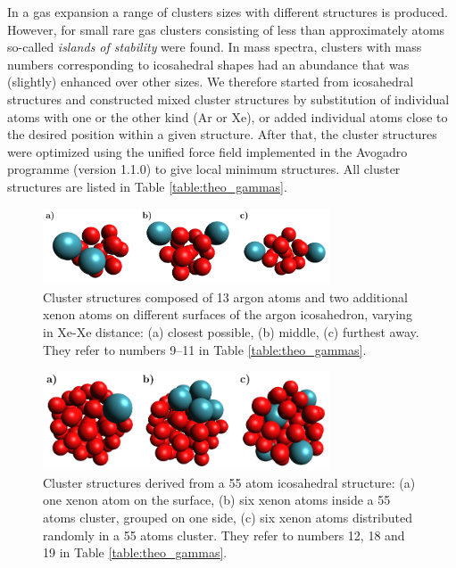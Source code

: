 In a gas expansion a range of clusters sizes with different structures is produced. 
However, for small rare gas clusters consisting of less than approximately \unit[1000]{atoms} so-called \emph{islands of stability} were found.\cite{haberland}  
In mass spectra, clusters with mass numbers corresponding to icosahedral shapes had an abundance that was (slightly) enhanced over other sizes. 
We therefore started from icosahedral structures and constructed mixed cluster structures by substitution of individual atoms with one or the other kind (Ar or Xe), or added individual atoms close to the desired position within a given structure. 
After that, the cluster structures were optimized using the unified force
field implemented in the 
Avogadro programme (version 1.1.0) \cite{Avogadro,Hanwell12} to give local
minimum structures.
All cluster structures are listed in Table \ref{table:theo_gammas}.
%
\begin{figure}[ht]
 \centering
 \includegraphics[width=8.5cm]{cluster_2_overview.pdf}
 \caption{Cluster structures composed of 13 argon atoms and two additional xenon
          atoms on different surfaces of the argon icosahedron, varying in Xe-Xe distance:
          (a) closest possible, (b) middle, (c) furthest away. They refer to
          numbers 9--11 in Table \ref{table:theo_gammas}.}
 \label{figure:cluster_2_overview}
\end{figure}
%
\begin{figure}[h]
 \centering
 \includegraphics[width=8.5cm]{cluster_3_overview.pdf}
 \caption{Cluster structures derived from a 55 atom icosahedral structure:
          (a) one xenon atom on the surface, (b) six xenon atoms inside a 55 atoms cluster,
          grouped on one side, (c) six xenon atoms distributed randomly
          in a 55 atoms cluster. They refer to numbers 12, 18 and 19
          in Table \ref{table:theo_gammas}.}
 \label{figure:cluster_3_overview}
\end{figure}

